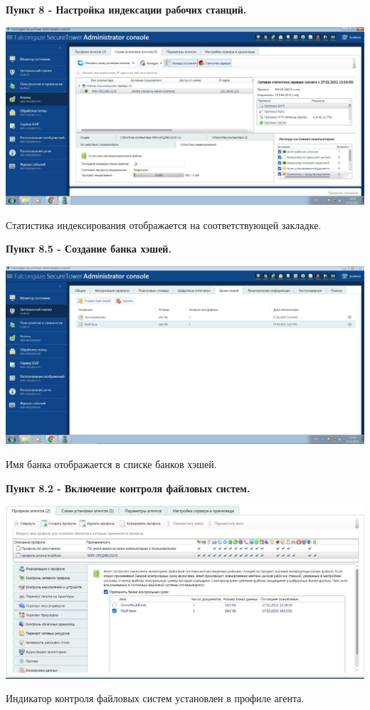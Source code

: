\documentclass[a4paper,14pt]{extarticle}
\begin{document}
    \newpage
    \textbf{Пункт 8 - Настройка индексации рабочих станций.} 
    \begin{center}
        \includegraphics[scale=0.25]{pics/8.jpg}

        Статистика индексирования отображается на соответствующей закладке.
    \end{center}

    \textbf{Пункт 8.5 - Создание банка хэшей.} 
    \begin{center}
        \includegraphics[scale=0.25]{pics/8_1.jpg}

        Имя банка отображается в списке банков хэшей.
    \end{center}

    \newpage
    \textbf{Пункт 8.2 - Включение контроля файловых систем.} 
    \begin{center}
        \includegraphics[scale=0.25]{pics/8_2.jpg}

        Индикатор контроля файловых систем установлен в профиле агента.
    \end{center}
\end{document}
